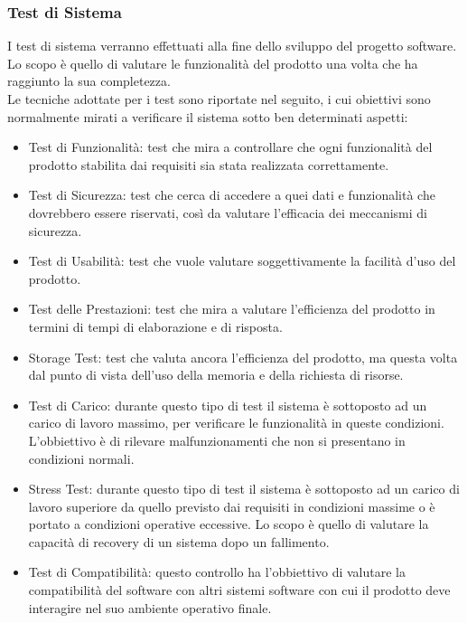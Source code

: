 \subsubsection{Test di Sistema}
I test di sistema verranno effettuati alla fine dello sviluppo del progetto
software. Lo scopo \`e quello di valutare le funzionalit\`a del prodotto una volta 
che ha raggiunto la sua completezza.\\ 
Le tecniche adottate per i test sono riportate nel seguito, i cui obiettivi sono 
normalmente mirati a verificare il sistema sotto ben determinati aspetti:

\begin{itemize}
  \item Test di Funzionalit\`a: test che mira a controllare che ogni funzionalit\`a del prodotto stabilita dai requisiti sia stata realizzata correttamente.
  \item Test di Sicurezza: test che cerca di accedere a quei dati e funzionalit\`a che dovrebbero essere riservati, cos\`i da valutare l'efficacia dei meccanismi di sicurezza.
  \item Test di Usabilit\`a:  test che vuole valutare soggettivamente la facilit\`a
  d'uso del prodotto.
  \item Test delle Prestazioni: test che mira a valutare l'efficienza del
  prodotto in termini di tempi di elaborazione e di risposta.
  \item Storage Test: test che valuta ancora l'efficienza del
  prodotto, ma questa volta dal punto di vista dell'uso della memoria e della richiesta di risorse.
  \item Test di Carico: durante questo tipo di test il sistema \`e sottoposto ad
  un carico di lavoro massimo, per verificare le funzionalit\`a in queste condizioni. L'obbiettivo \`e di rilevare malfunzionamenti che non si presentano in condizioni normali.
  \item Stress Test: durante questo tipo di test il sistema \`e sottoposto ad un
  carico di lavoro superiore da quello previsto dai requisiti in condizioni massime o \`e portato a condizioni operative eccessive. Lo scopo \`e quello di valutare la capacit\`a di recovery di un sistema dopo un fallimento.
  \item Test di Compatibilit\`a: questo controllo ha l'obbiettivo di valutare la
  compatibilit\`a del software con altri sistemi software con cui il prodotto deve interagire nel suo ambiente operativo finale.
 \end{itemize}


